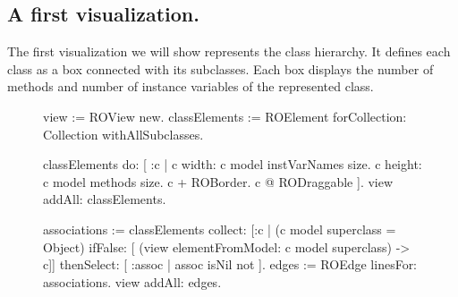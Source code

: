 \documentclass[a4paper,10pt,twoside]{book}
\begin{document}
\subsection{A first visualization.}

The first visualization we will show represents the  class hierarchy. It defines each class as a box connected with its subclasses. Each box displays the number of methods and number of instance variables of the  represented class.

\begin{figure}[H]
      \begin{minipage}[t]{0.55\textwidth}
      \vspace{0pt}
\begin{code}{}
view := ROView new.
classElements := ROElement forCollection: Collection withAllSubclasses.

classElements 
	do: [ :c | 
		c width: c model instVarNames size.
		c height: c model methods size.
		c + ROBorder. 
		c @ RODraggable ].
view addAll: classElements.

associations := classElements 
	collect: [:c | 
		(c model superclass = Object)
			ifFalse: [ (view elementFromModel: c model superclass) -> c]] 
	 thenSelect: [ :assoc | assoc isNil not ].
edges := ROEdge linesFor: associations.
view addAll: edges.


\end{code}
\end{minipage}
\end{figure}
\end{document}
